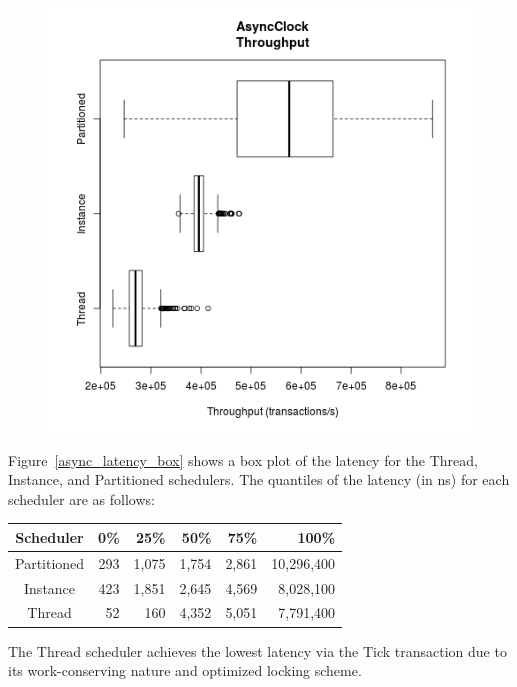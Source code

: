 \begin{figure}
\center
\includegraphics[height=.4\textheight]{async_throughput_box.png}
\caption{\label{async_throughput_box}}
\end{figure}

Figure~\ref{async_latency_box} shows a box plot of the latency for the Thread, Instance, and Partitioned schedulers.
The quantiles of the latency (in ns) for each scheduler are as follows:
\begin{center}
\begin{tabular}{crrrrr}
Scheduler &       0\%  &    25\%  &    50\%  &    75\%  &   100\% \\
\hline
Partitioned & 293 & 1,075 & 1,754 & 2,861 & 10,296,400 \\
Instance    & 423 & 1,851 & 2,645 & 4,569 &  8,028,100 \\
Thread      &  52 &   160 & 4,352 & 5,051 &  7,791,400 \\
\end{tabular}
\end{center}
The Thread scheduler achieves the lowest latency via the Tick transaction due to its work-conserving nature and optimized locking scheme.

